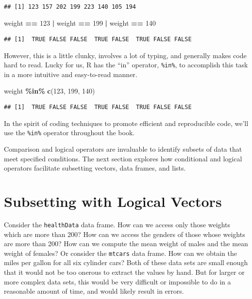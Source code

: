 \documentclass[
]{krantz}
\newenvironment{Shaded}{\begin{snugshade}}{\end{snugshade}}
\newcommand{\DecValTok}[1]{\textcolor[rgb]{0.00,0.00,0.81}{#1}}
\newcommand{\KeywordTok}[1]{\textcolor[rgb]{0.13,0.29,0.53}{\textbf{#1}}}
\newcommand{\NormalTok}[1]{#1}
\newcommand{\OperatorTok}[1]{\textcolor[rgb]{0.81,0.36,0.00}{\textbf{#1}}}
\newcommand{\StringTok}[1]{\textcolor[rgb]{0.31,0.60,0.02}{#1}}
\begin{document}
\begin{verbatim}
## [1] 123 157 202 199 223 140 105 194
\end{verbatim}

\begin{Shaded}
\begin{Highlighting}[]
\NormalTok{weight }\OperatorTok{==}\StringTok{ }\DecValTok{123} \OperatorTok{|}\StringTok{ }\NormalTok{weight }\OperatorTok{==}\StringTok{ }\DecValTok{199} \OperatorTok{|}\StringTok{ }\NormalTok{weight }\OperatorTok{==}\StringTok{ }\DecValTok{140}
\end{Highlighting}
\end{Shaded}

\begin{verbatim}
## [1]  TRUE FALSE FALSE  TRUE FALSE  TRUE FALSE FALSE
\end{verbatim}

However, this is a little clunky, involves a lot of typing, and generally makes code hard to read. Lucky for us, R has the ``in'' operator, \texttt{\%in\%}, to accomplish this task in a more intuitive and easy-to-read manner.

\begin{Shaded}
\begin{Highlighting}[]
\NormalTok{weight }\OperatorTok{\%in\%}\StringTok{ }\KeywordTok{c}\NormalTok{(}\DecValTok{123}\NormalTok{, }\DecValTok{199}\NormalTok{, }\DecValTok{140}\NormalTok{)}
\end{Highlighting}
\end{Shaded}

\begin{verbatim}
## [1]  TRUE FALSE FALSE  TRUE FALSE  TRUE FALSE FALSE
\end{verbatim}

In the spirit of coding techniques to promote efficient and reproducible code, we'll use the \texttt{\%in\%} operator throughout the book.

Comparison and logical operators are invaluable to identify subsets of data that meet specified conditions. The next section explores how conditional and logical operators facilitate subsetting vectors, data frames, and lists.

\hypertarget{subsetting}{%
\section{Subsetting with Logical Vectors}\label{subsetting}}

Consider the \texttt{healthData} data frame. How can we access only those weights which are more than 200? How can we access the genders of those whose weights are more than 200? How can we compute the mean weight of males and the mean weight of females? Or consider the \texttt{mtcars} data frame. How can we obtain the miles per gallon for all six cylinder cars? Both of these data sets are small enough that it would not be too onerous to extract the values by hand. But for larger or more complex data sets, this would be very difficult or impossible to do in a reasonable amount of time, and would likely result in errors.
\end{document}
